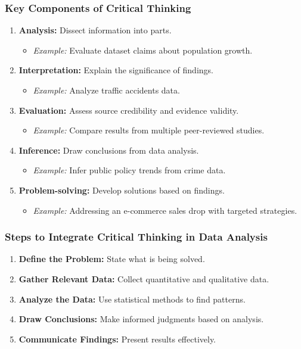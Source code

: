 \documentclass[aspectratio=169]{beamer}
\begin{document}
\begin{frame}[fragile]
    \frametitle{Key Components of Critical Thinking}
    \begin{enumerate}
        \item \textbf{Analysis:} Dissect information into parts.
            \begin{itemize}
                \item \textit{Example:} Evaluate dataset claims about population growth.
            \end{itemize}
        \item \textbf{Interpretation:} Explain the significance of findings.
            \begin{itemize}
                \item \textit{Example:} Analyze traffic accidents data.
            \end{itemize}
        \item \textbf{Evaluation:} Assess source credibility and evidence validity.
            \begin{itemize}
                \item \textit{Example:} Compare results from multiple peer-reviewed studies.
            \end{itemize}
        \item \textbf{Inference:} Draw conclusions from data analysis.
            \begin{itemize}
                \item \textit{Example:} Infer public policy trends from crime data.
            \end{itemize}
        \item \textbf{Problem-solving:} Develop solutions based on findings.
            \begin{itemize}
                \item \textit{Example:} Addressing an e-commerce sales drop with targeted strategies.
            \end{itemize}
    \end{enumerate}
\end{frame}

\begin{frame}[fragile]
    \frametitle{Steps to Integrate Critical Thinking in Data Analysis}
    \begin{enumerate}
        \item \textbf{Define the Problem:} State what is being solved.
        \item \textbf{Gather Relevant Data:} Collect quantitative and qualitative data.
        \item \textbf{Analyze the Data:} Use statistical methods to find patterns.
        \item \textbf{Draw Conclusions:} Make informed judgments based on analysis.
        \item \textbf{Communicate Findings:} Present results effectively.
    \end{enumerate}
\end{frame}
\end{document}
